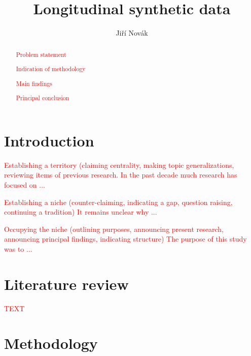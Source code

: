 \documentclass{article}
\title{Longitudinal synthetic data
}
\author{Jiří Novák
        }
\begin{document}
\maketitle

\begin{abstract}
\textcolor{red}{Problem statement} 

\textcolor{red}{Indication of methodology} 

\textcolor{red}{Main findings} 

\textcolor{red}{Principal conclusion} 
\end{abstract}

\section{Introduction}

\textcolor{red}{Establishing a territory (claiming centrality, making topic generalizations, reviewing items of previous research.} 
\textcolor{red}{In the past decade much research has focused on ...} 

\textcolor{red}{Establishing a niche (counter-claiming, indicating a gap, question raising, continuing a tradition)} 
\textcolor{red}{It remains unclear why ...} 

\textcolor{red}{Occupying the niche (outlining purposes, announcing present research, announcing principal findings, indicating structure)} 
\textcolor{red}{The purpose of this study was to ...} 

\section{Literature review}

\textcolor{red}{TEXT} 

\section{Methodology}
\end{document}
